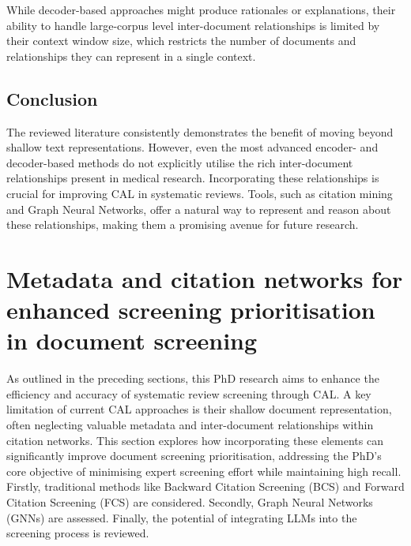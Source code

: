 \documentclass[10pt,oneside]{book}
\begin{document}
While decoder-based approaches might produce rationales or explanations, their ability to handle large-corpus level inter-document relationships is limited by their context window size, which restricts the number of documents and relationships they can represent in a single context.

\subsection{Conclusion}
The reviewed literature consistently demonstrates the benefit of moving beyond shallow text representations. However, even the most advanced encoder- and decoder-based methods do not explicitly utilise the rich inter-document relationships present in medical research.  Incorporating these relationships is crucial for improving CAL in systematic reviews. Tools, such as citation mining and Graph Neural Networks, offer a natural way to represent and reason about these relationships, making them a promising avenue for future research.

\newpage


\newpage
\section{Metadata and citation networks for enhanced screening prioritisation in document screening}

As outlined in the preceding sections, this PhD research aims to enhance the efficiency and accuracy of systematic review screening through CAL. A key limitation of current CAL approaches is their shallow document representation, often neglecting valuable metadata and inter-document relationships within citation networks. This section explores how incorporating these elements can significantly improve document screening prioritisation, addressing the PhD's core objective of minimising expert screening effort while maintaining high recall. Firstly, traditional methods like Backward Citation Screening (BCS) and Forward Citation Screening (FCS) are considered. Secondly, Graph Neural Networks (GNNs) are assessed. Finally, the potential of integrating LLMs into the screening process is reviewed.
\end{document}
